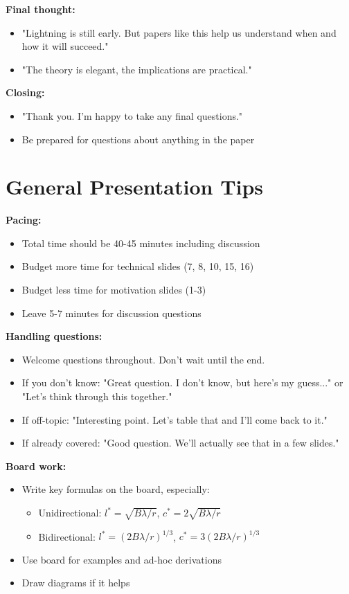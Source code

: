 \documentclass[11pt]{article}
\begin{document}
\textbf{Final thought:}
\begin{itemize}
    \item "Lightning is still early. But papers like this help us understand when and how it will succeed."
    \item "The theory is elegant, the implications are practical."
\end{itemize}

\textbf{Closing:}
\begin{itemize}
    \item "Thank you. I'm happy to take any final questions."
    \item Be prepared for questions about anything in the paper
\end{itemize}

\section*{General Presentation Tips}

\textbf{Pacing:}
\begin{itemize}
    \item Total time should be 40-45 minutes including discussion
    \item Budget more time for technical slides (7, 8, 10, 15, 16)
    \item Budget less time for motivation slides (1-3)
    \item Leave 5-7 minutes for discussion questions
\end{itemize}

\textbf{Handling questions:}
\begin{itemize}
    \item Welcome questions throughout. Don't wait until the end.
    \item If you don't know: "Great question. I don't know, but here's my guess..." or "Let's think through this together."
    \item If off-topic: "Interesting point. Let's table that and I'll come back to it."
    \item If already covered: "Good question. We'll actually see that in a few slides."
\end{itemize}

\textbf{Board work:}
\begin{itemize}
    \item Write key formulas on the board, especially:
    \begin{itemize}
        \item Unidirectional: $l^* = \sqrt{B\lambda/r}$, $c^* = 2\sqrt{B\lambda/r}$
        \item Bidirectional: $l^* = (2B\lambda/r)^{1/3}$, $c^* = 3(2B\lambda/r)^{1/3}$
    \end{itemize}
    \item Use board for examples and ad-hoc derivations
    \item Draw diagrams if it helps
\end{itemize}
\end{document}
